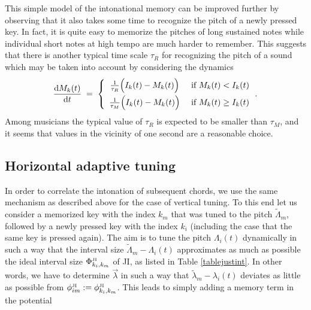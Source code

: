 This simple model of the intonational memory can be improved further by observing that it also takes some time to recognize the pitch of a newly pressed key. In fact, it is quite easy to memorize the pitches of long sustained notes while individual short notes at high tempo are much harder to remember. This suggests that there is another typical time scale $\tau_R$ for recognizing the pitch of a sound which may be taken into account by considering the dynamics
%
\begin{equation}
\label{memory}
\frac{{\rm d} M_k(t)}{{\rm d} t} \;=\; 
\left\{ \begin{array}{cc}
        \frac{1}{\tau_R} \Bigl(I_k(t)-M_k(t)\Bigr) & \mbox{ if } M_k(t) < I_k(t) \\[2mm]
        \frac{1}{\tau_M} \Bigl(I_k(t)-M_k(t)\Bigr) & \mbox{ if }  M_k(t) \geq I_k(t)
        \end{array}\,.
\right.
\end{equation}
%
Among musicians the typical value of $\tau_R$ is expected to be smaller than $\tau_M$, and it seems that values in the vicinity of one second are a reasonable choice.

\subsection{Horizontal adaptive tuning}

In order to correlate the intonation of subsequent chords, we use the same mechanism as described above for the case of vertical tuning. To this end let us consider a memorized key with the index $k_m$ that was tuned to the pitch $\tilde \Lambda_m$, followed by a newly pressed key with the index $k_i$ (including the case that the same key is pressed again). The aim is to tune the pitch $\Lambda_i(t)$ dynamically in such a way that the interval size $\tilde\Lambda_m-\Lambda_i(t)$ approximates as much as possible the ideal interval size $\Phi_{k_i,k_m}^{\rm\scriptscriptstyle JI}$ of JI, as listed in Table \ref{tablejustint}. In other words, we have to determine $\vec\lambda$ in such a way that $\tilde\lambda_m-\lambda_i(t)$ deviates as little as possible from $\phi_{im}^{\rm\scriptscriptstyle JI}:=\phi_{k_i,k_m}^{\rm\scriptscriptstyle JI}$. This leads to simply adding a memory term in the potential

